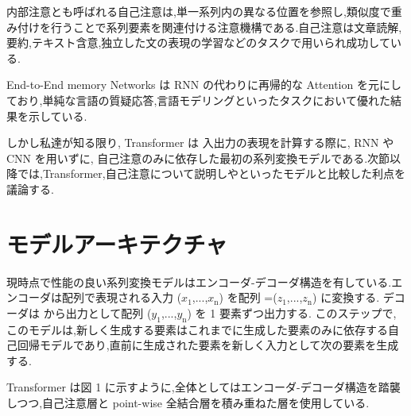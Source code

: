 \documentclass{jarticle}     %
\begin{document}
内部注意とも呼ばれる自己注意は,単一系列内の異なる位置を参照し,類似度で重み付けを行うことで系列要素を関連付ける注意機構である.自己注意は文章読解,要約,テキスト含意,独立した文の表現の学習などのタスクで用いられ成功している.\cite{4,22,23,19}\par

End-to-End memory Networks は RNN の代わりに再帰的な Attention を元にしており,単純な言語の質疑応答,言語モデリングといったタスクにおいて優れた結果を示している.\cite{28}\par

しかし私達が知る限り, Transformer は 入出力の表現を計算する際に, RNN や CNN を用いずに, 自己注意のみに依存した最初の系列変換モデルである.次節以降では,Transformer,自己注意について説明し\cite{14,15}や\cite{8}といったモデルと比較した利点を議論する.




\section{モデルアーキテクチャ}
現時点で性能の良い系列変換モデルはエンコーダ-デコーダ構造を有している.\cite{5,2,29}エンコーダは配列で表現される入力 ($x_\mathrm{1}$,...,$x_\mathrm{n}$) を配列 =($z_\mathrm{1}$,...,$z_\mathrm{n}$) に変換する.
デコーダは  から出力として配列 ($y_\mathrm{1}$,...,$y_\mathrm{n}$) を 1 要素ずつ出力する.
このステップで,このモデルは,新しく生成する要素はこれまでに生成した要素のみに依存する自己回帰モデル\cite{自己回帰モデル,9}であり,直前に生成された要素を新しく入力として次の要素を生成する.\par
Transformer は図 1 に示すように,全体としてはエンコーダ-デコーダ構造を踏襲しつつ,自己注意層と point-wise 全結合層を積み重ねた層を使用している.
\end{document}
